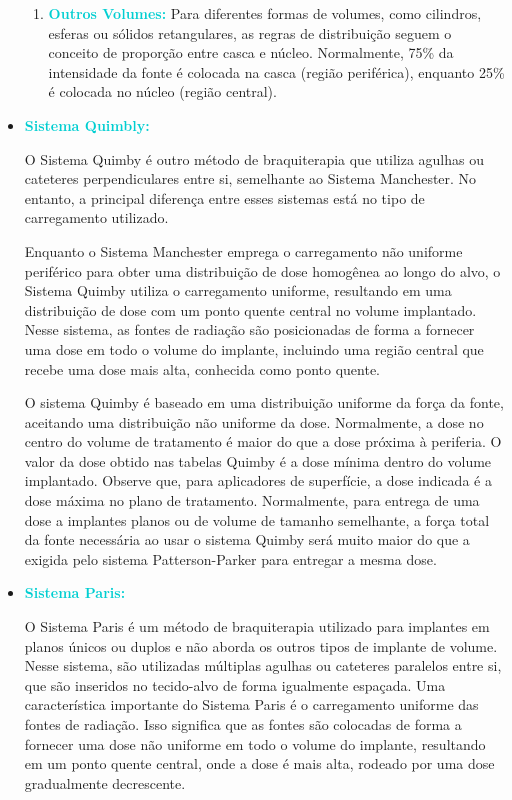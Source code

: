 \documentclass[11pt,a4paper]{article}
\begin{document}
\begin{itemize}
\begin{enumerate}[label=\textcolor{CarnationPink}{(\roman*)}]
					\item \textcolor{DarkTurquoise}{\textbf{Outros Volumes:}} Para diferentes formas de volumes, como cilindros, esferas ou sólidos retangulares, as regras de distribuição seguem o conceito de proporção entre casca e núcleo. Normalmente, 75\% da intensidade da fonte é colocada na casca (região periférica), enquanto 25\% é colocada no núcleo (região central).
				\end{enumerate}
				
				\item \textcolor{DarkTurquoise}{\textbf{Sistema Quimbly:}}
				
				O Sistema Quimby é outro método de braquiterapia que utiliza agulhas ou cateteres perpendiculares entre si, semelhante ao Sistema Manchester. No entanto, a principal diferença entre esses sistemas está no tipo de carregamento utilizado.

				Enquanto o Sistema Manchester emprega o carregamento não uniforme periférico para obter uma distribuição de dose homogênea ao longo do alvo, o Sistema Quimby utiliza o carregamento uniforme, resultando em uma distribuição de dose com um ponto quente central no volume implantado. Nesse sistema, as fontes de radiação são posicionadas de forma a fornecer uma dose  em todo o volume do implante, incluindo uma região central que recebe uma dose mais alta, conhecida como ponto quente.

				O sistema Quimby é baseado em uma distribuição uniforme da força da fonte, aceitando uma distribuição não uniforme da dose. Normalmente, a dose no centro do volume de tratamento é maior do que a dose próxima à periferia. O valor da dose obtido nas tabelas Quimby é a dose mínima dentro do volume implantado. Observe que, para aplicadores de superfície, a dose indicada é a dose máxima no plano de tratamento. Normalmente, para entrega de uma dose a implantes planos ou de volume de tamanho semelhante, a força total da fonte necessária ao usar o sistema Quimby será muito maior do que a exigida pelo sistema Patterson-Parker para entregar a mesma dose.
				
				\item \textcolor{DarkTurquoise}{\textbf{Sistema Paris:}}
				
				O Sistema Paris é um método de braquiterapia utilizado para implantes em planos únicos ou duplos e não aborda os outros tipos de implante de volume. Nesse sistema, são utilizadas múltiplas agulhas ou cateteres paralelos entre si, que são inseridos no tecido-alvo de forma igualmente espaçada. Uma característica importante do Sistema Paris é o carregamento uniforme das fontes de radiação. Isso significa que as fontes são colocadas de forma a fornecer uma dose não uniforme em todo o volume do implante, resultando em um ponto quente central, onde a dose é mais alta, rodeado por uma dose gradualmente decrescente.


\end{itemize}
\end{document}
